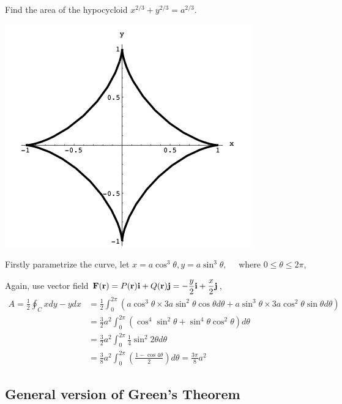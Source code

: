 \begin{spacing}{1.3}
    \vspace{\fill}
    \eg Find the area of the hypocycloid $x^{2 / 3}+y^{2 / 3}=a^{2 / 3}$.
    \begin{center}
        \includegraphics[scale=0.55]{images/Ch16-green-area-eg2.png}
    \end{center}

    \sol 
    Firstly parametrize the curve, 
    let $x=a \cos ^{3} \theta, y=a \sin ^{3} \theta, \quad$ where $0 \leqslant \theta \leqslant 2 \pi$,

    Again, use vector field $\displaystyle {\bf F}({\bf r})=P({\bf r}){\bf i}+Q({\bf r}){\bf j}=-\frac{y}{2}{\bf i}+\frac{x}{2}{\bf j}$,
    \begin{align*}
        A=\frac{1}{2} \oint_{C} x d y-y d x &=\frac{1}{2} \int_{0}^{2 \pi}\left(a \cos ^{3} \theta \times 3 a \sin ^{2} \theta \cos \theta d \theta+a \sin ^{3} \theta \times 3 a \cos ^{2} \theta \sin \theta d \theta\right) \\
        &=\frac{3}{2} a^{2} \int_{0}^{2 \pi}\left(\cos ^{4} \sin ^{2} \theta+\sin ^{4} \theta \cos ^{2} \theta\right) d \theta \\
        &=\frac{3}{2} a^{2} \int_{0}^{2 \pi} \frac{1}{4} \sin ^{2} 2 \theta d \theta \\
        &=\frac{3}{8} a^{2} \int_{0}^{2 \pi}\left(\frac{1-\cos 4 \theta}{2}\right) d \theta=\frac{3 \pi}{8} a^{2}
    \end{align*}



    \newpage
    \subsection{General version of Green’s Theorem}


\end{spacing}
